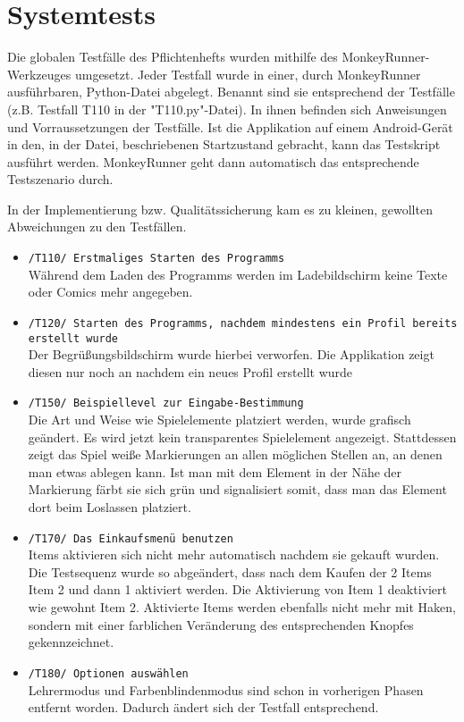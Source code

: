 \section{Systemtests}

Die globalen Testfälle des Pflichtenhefts wurden mithilfe des MonkeyRunner-Werkzeuges umgesetzt.
Jeder Testfall wurde in einer, durch MonkeyRunner ausführbaren, Python-Datei abgelegt. Benannt sind sie entsprechend der Testfälle
(z.B. Testfall T110  in der "T110.py"-Datei). In ihnen befinden sich Anweisungen und Vorraussetzungen der Testfälle. Ist die Applikation auf einem Android-Gerät in den, in der Datei, beschriebenen Startzustand gebracht, kann das Testskript ausführt werden. MonkeyRunner geht dann automatisch das entsprechende Testszenario durch.

In der Implementierung bzw. Qualitätssicherung kam es zu kleinen, gewollten Abweichungen zu den Testfällen.

\begin{itemize}
	\item \texttt{/T110/ Erstmaliges Starten des Programms}\\
		Während dem Laden des Programms werden im Ladebildschirm keine Texte oder Comics mehr angegeben. 
	\item \texttt{/T120/ Starten des Programms, nachdem mindestens ein Profil bereits erstellt wurde}\\
		Der Begrüßungsbildschirm wurde hierbei verworfen. Die Applikation zeigt diesen nur noch an nachdem ein neues Profil 	erstellt wurde
	\item \texttt{/T150/ Beispiellevel zur Eingabe-Bestimmung}\\ 
		Die Art und Weise wie Spielelemente platziert werden, wurde grafisch geändert. Es wird jetzt kein transparentes Spielelement angezeigt. Stattdessen zeigt das Spiel weiße Markierungen an allen möglichen Stellen an, an denen man etwas ablegen kann. Ist man mit dem Element in der Nähe der Markierung färbt sie sich grün und signalisiert somit, dass man das Element dort beim Loslassen platziert.
	\item \texttt{/T170/ Das Einkaufsmenü benutzen}\\ 
		Items aktivieren sich nicht mehr automatisch nachdem sie gekauft wurden. Die Testsequenz wurde so abgeändert, dass nach dem Kaufen der 2 Items Item 2 und dann 1 aktiviert werden. Die Aktivierung von Item 1 deaktiviert wie gewohnt Item 2. 
		Aktivierte Items werden ebenfalls nicht mehr mit Haken, sondern mit einer farblichen Veränderung des entsprechenden Knopfes gekennzeichnet.
	\item \texttt{/T180/ Optionen auswählen}\\
		Lehrermodus und Farbenblindenmodus sind schon in vorherigen Phasen entfernt worden. Dadurch ändert sich der Testfall entsprechend.
\end{itemize}

